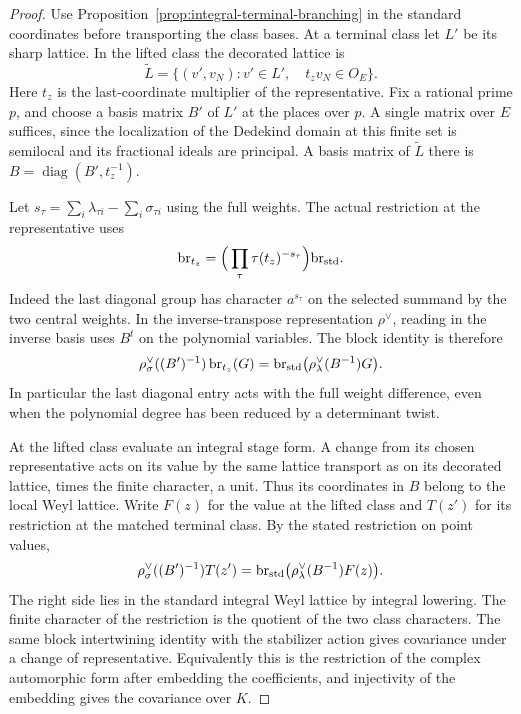 \begin{proof}
Use Proposition~\ref{prop:integral-terminal-branching} in the
standard coordinates before transporting the class bases.
At a terminal class let \(L'\) be its sharp lattice. In the
lifted class the decorated lattice is
\[
  \widetilde L=\{(v',v_N): v'\in L',\quad t_zv_N\in O_E\}.
\]
Here \(t_z\) is the last-coordinate multiplier of the
representative. Fix a rational prime \(p\), and choose a basis
matrix \(B'\) of \(L'\) at the places over \(p\). A single
matrix over \(E\) suffices, since the localization of the
Dedekind domain at this finite set is semilocal and its
fractional ideals are principal. A basis matrix of
\(\widetilde L\) there is \(B=\operatorname{diag}(B',t_z^{-1})\).

Let \(s_\tau=\sum_i\lambda_{\tau i}-\sum_i\sigma_{\tau i}\)
using the full weights. The actual restriction at the
representative uses
\[
   \mathrm{br}_{t_z}=
        \Big(\prod_\tau\tau(t_z)^{-s_\tau}\Big)\mathrm{br}_{\rm std}.
\]
Indeed the last diagonal group has character \(a^{s_\tau}\)
on the selected summand by the two central weights. In the
inverse-transpose representation \(\rho^\vee\), reading in
the inverse basis uses \(B^t\) on the polynomial variables.
The block identity is therefore
\begin{equation}\label{eq:terminal-block-identity}
 \rho^\vee_\sigma((B')^{-1})\,\mathrm{br}_{t_z}(G)
       =\mathrm{br}_{\rm std}\big(\rho^\vee_\lambda(B^{-1})G\big).
\end{equation}
In particular the last diagonal entry acts with the full
weight difference, even when the polynomial degree has
been reduced by a determinant twist.

At the lifted class evaluate an integral stage form. A change
from its chosen representative acts on its value by the same
lattice transport as on its decorated lattice, times the finite
character, a unit. Thus its coordinates in \(B\) belong to
the local Weyl lattice. Write \(F(z)\) for the value at the lifted class and
\(T(z')\) for its restriction at the matched terminal class.
By the stated restriction on point values,
\[
   \rho^\vee_\sigma((B')^{-1})T(z')
      =\mathrm{br}_{\rm std}\bigl(\rho^\vee_\lambda(B^{-1})F(z)\bigr).
\]
The right side lies in the standard integral Weyl lattice
by integral lowering. The finite character of the restriction
is the quotient of the two class characters. The same block
intertwining identity with the stabilizer action gives covariance
under a change of representative. Equivalently this is the
restriction of the complex automorphic form after embedding
the coefficients, and injectivity of the embedding gives the
covariance over \(K\).


\end{proof}
